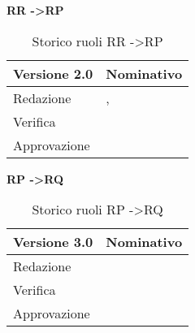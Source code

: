 \textbf{RR -\textgreater RP}

\begin{table}[h]
\begin{center}

\begin{tabular}{p{} p{}}
\toprule
\textbf{Versione 2.0}	&	\textbf{Nominativo}\\
\midrule
\midrule
Redazione	&	\MB, \EZ \\
\midrule
Verifica &	\AB	\\
\midrule
Approvazione	&	\SL	\\
\bottomrule
\end{tabular}
\caption{Storico ruoli RR -\textgreater RP}
\label{tabVers1}
\end{center}
\end{table}


\textbf{RP -\textgreater RQ}

\begin{table}[h]
\begin{center}

\begin{tabular}{p{} p{}}
\toprule
\textbf{Versione 3.0}	&	\textbf{Nominativo}\\
\midrule
\midrule
Redazione	&	\FZ \\
\midrule
Verifica &	\EZ	\\
\midrule
Approvazione	&	\VP	\\
\bottomrule
\end{tabular}
\caption{Storico ruoli RP -\textgreater RQ}
\label{tabVers1}
\end{center}
\end{table}
